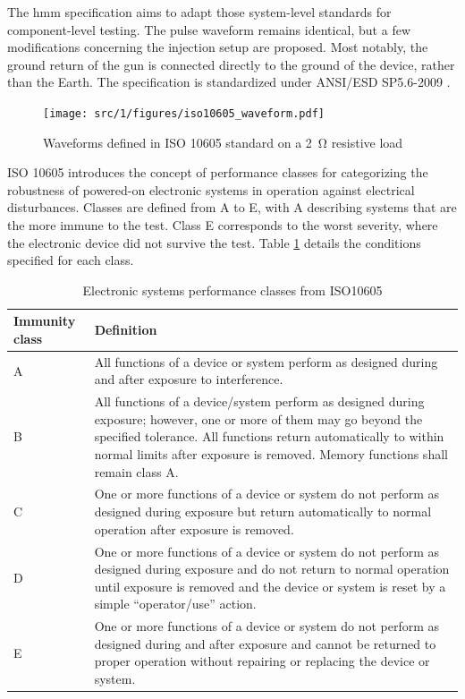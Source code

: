 The \gls{hmm} \cite{hmm} specification aims to adapt those system-level standards for component-level testing.
The pulse waveform remains identical, but a few modifications concerning the injection setup are proposed.
Most notably, the ground return of the gun is connected directly to the ground of the device, rather than the Earth.
The specification is standardized under ANSI/ESD SP5.6-2009 \cite{hmm}.

\begin{figure}[!h]
  \centering
  \texttt{[image: src/1/figures/iso10605\_waveform.pdf]}
  \caption{Waveforms defined in ISO 10605 standard on a \SI{2}{\ohm} resistive load}
  \label{iso_pulse}
\end{figure}

ISO 10605 introduces the concept of performance classes for categorizing the robustness of powered-on electronic systems in operation against electrical disturbances.
Classes are defined from A to E, with A describing systems that are the more immune to the test.
Class E corresponds to the worst severity, where the electronic device did not survive the test.
Table \ref{tab:iso-class-a-levels} details the conditions specified for each class.

\begin{table}[!h]
\centering
\begin{tabular}{l|p{}}
Immunity class  & Definition   \\ \midrule
A  & All functions of a device or system perform as designed during and after exposure to interference.  \\ \midrule
B  & All functions of a device/system perform as designed during exposure; however, one or more of them may go beyond the specified tolerance. All functions return automatically to within normal limits after exposure is removed. Memory functions shall remain class A. \\ \midrule
C  & One or more functions of a device or system do not perform as designed during exposure but return automatically to normal operation after exposure is removed.   \\ \midrule
D  &  One or more functions of a device or system do not perform as designed during exposure and do not return to normal operation until exposure is removed and the device or system is reset by a simple “operator/use” action.   \\ \midrule
E   &  One or more functions of a device or system do not perform as designed during and after exposure and cannot be returned to proper operation without repairing or replacing the device or system.  \\
\bottomrule
\end{tabular}
\caption{Electronic systems performance classes from ISO10605}
\label{tab:iso-class-a-levels}
\end{table}

